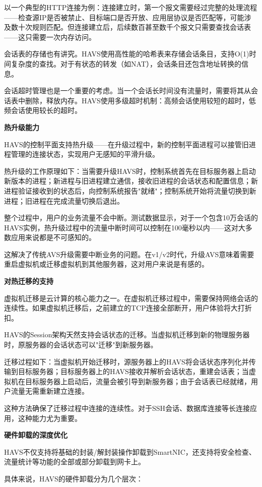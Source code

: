 以一个典型的HTTP连接为例：连接建立时，第一个报文需要经过完整的处理流程——检查源IP是否被禁止、目标端口是否开放、应用层协议是否匹配等，可能涉及数十次规则匹配。但连接建立后，后续数百甚至数千个报文只需要查找会话表——这只需要一次内存访问。

会话表的存储也有讲究。HAVS使用高性能的哈希表来存储会话条目，支持O(1)时间复杂度的查找。对于有状态的转发（如NAT），会话条目还包含地址转换的信息。

会话超时管理也是一个重要的考虑。当一个会话长时间没有流量时，需要将其从会话表中删除，释放内存。HAVS使用多级超时机制：高频会话使用较短的超时，低频会话使用较长的超时。

\textbf{热升级能力}

HAVS的控制平面支持热升级——在升级过程中，新的控制平面进程可以接管旧进程管理的连接状态，实现用户无感知的平滑升级。

热升级的工作原理如下：当需要升级HAVS时，控制系统首先在目标服务器上启动新版本的进程；新进程与旧进程建立通信，接收旧进程的会话状态和配置信息；新进程验证接收到的状态后，向控制系统报告"就绪"；控制系统开始将流量切换到新进程；旧进程在完成流量切换后退出。

整个过程中，用户的业务流量不会中断。测试数据显示，对于一个包含10万会话的HAVS实例，热升级过程中的流量中断时间可以控制在100毫秒以内——这对大多数应用来说都是不可感知的。

这解决了传统AVS升级需要中断业务的问题。在v1/v2时代，升级AVS意味着需要重启虚拟机或迁移虚拟机到其他服务器，这对用户来说是有感的。

\textbf{对热迁移的支持}

虚拟机迁移是云计算的核心能力之一。在虚拟机迁移过程中，需要保持网络会话的连续性。如果虚拟机迁移后，之前建立的TCP连接全部断开，用户体验将大打折扣。

HAVS的Session架构天然支持会话状态的迁移。当虚拟机迁移到新的物理服务器时，原服务器的会话状态可以"迁移"到新服务器。

迁移过程如下：当虚拟机开始迁移时，源服务器上的HAVS将会话状态序列化并传输到目标服务器；目标服务器上的HAVS接收并解析会话状态，重建会话表；当虚拟机在目标服务器上启动后，流量会被引导到新服务器；由于会话表已经就绪，用户流量无需重新建立连接。

这种方法确保了迁移过程中连接的连续性。对于SSH会话、数据库连接等长连接应用，这种能力尤为重要。

\textbf{硬件卸载的深度优化}

HAVS不仅支持将基础的封装/解封装操作卸载到SmartNIC，还支持将安全检查、流量统计等功能的全部或部分卸载到网卡上。

具体来说，HAVS的硬件卸载分为几个层次：

